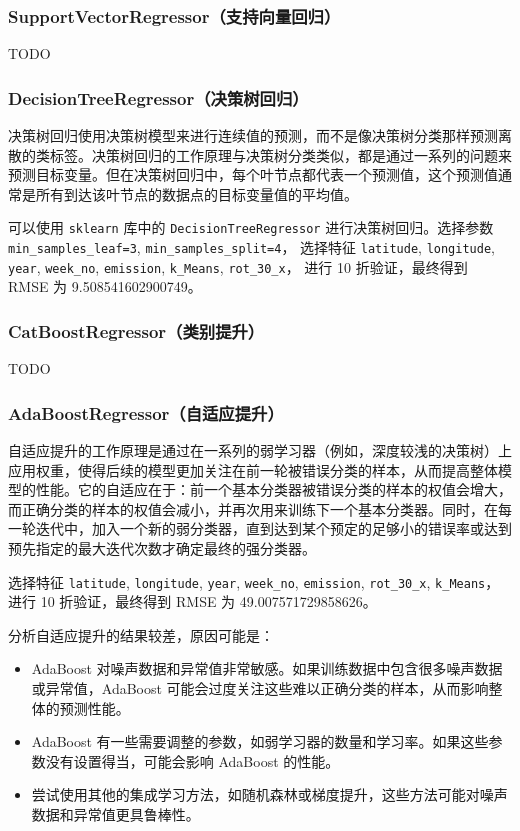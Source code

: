 \documentclass{ctexart}
\begin{document}
\subsubsection{SupportVectorRegressor（支持向量回归）}

TODO

\subsubsection{DecisionTreeRegressor（决策树回归）}

决策树回归使用决策树模型来进行连续值的预测，而不是像决策树分类那样预测离散的类标签。决策树回归的工作原理与决策树分类类似，都是通过一系列的问题来预测目标变量。但在决策树回归中，每个叶节点都代表一个预测值，这个预测值通常是所有到达该叶节点的数据点的目标变量值的平均值。

可以使用 \texttt{sklearn} 库中的 \texttt{DecisionTreeRegressor} 进行决策树回归。选择参数
\texttt{min\_samples\_leaf=3}, \texttt{min\_samples\_split=4}，
选择特征 \texttt{latitude}, \texttt{longitude}, \texttt{year}, \texttt{week\_no}, \texttt{emission}, \texttt{k\_Means}, \texttt{rot\_30\_x}，
进行 10 折验证，最终得到 RMSE 为 9.508541602900749。

\subsubsection{CatBoostRegressor（类别提升）}

TODO

\subsubsection{AdaBoostRegressor（自适应提升）}

自适应提升的工作原理是通过在一系列的弱学习器（例如，深度较浅的决策树）上应用权重，使得后续的模型更加关注在前一轮被错误分类的样本，从而提高整体模型的性能。它的自适应在于：前一个基本分类器被错误分类的样本的权值会增大，而正确分类的样本的权值会减小，并再次用来训练下一个基本分类器。同时，在每一轮迭代中，加入一个新的弱分类器，直到达到某个预定的足够小的错误率或达到预先指定的最大迭代次数才确定最终的强分类器。

选择特征 \texttt{latitude}, \texttt{longitude}, \texttt{year}, \texttt{week\_no}, \texttt{emission}, \texttt{rot\_30\_x}, \texttt{k\_Means}，进行 10 折验证，最终得到 RMSE 为 49.007571729858626。

分析自适应提升的结果较差，原因可能是：

\begin{itemize}
      \item AdaBoost 对噪声数据和异常值非常敏感。如果训练数据中包含很多噪声数据或异常值，AdaBoost 可能会过度关注这些难以正确分类的样本，从而影响整体的预测性能。
      \item AdaBoost 有一些需要调整的参数，如弱学习器的数量和学习率。如果这些参数没有设置得当，可能会影响 AdaBoost 的性能。
      \item 尝试使用其他的集成学习方法，如随机森林或梯度提升，这些方法可能对噪声数据和异常值更具鲁棒性。
\end{itemize}
\end{document}
